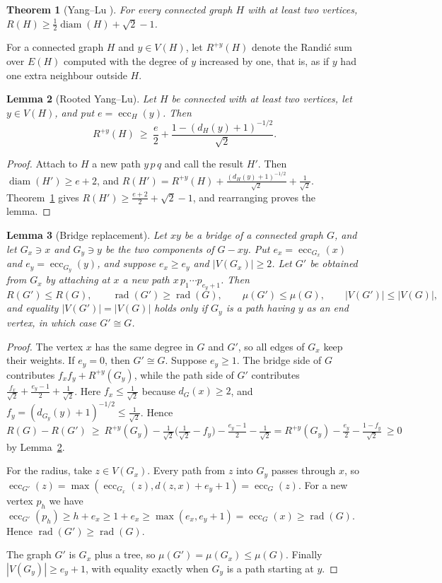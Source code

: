 \documentclass[11pt,a4paper]{article}
\newtheorem{theorem}{Theorem}[section]
\newtheorem{lemma}[theorem]{Lemma}
\theoremstyle{definition}
\newcommand{\rad}{\operatorname{rad}}
\newcommand{\diam}{\operatorname{diam}}
\newcommand{\ecc}{\operatorname{ecc}}
\begin{document}
\begin{theorem}[Yang--Lu \cite{YangLu}]\label{thm:YL}
For every connected graph $H$ with at least two vertices, $R(H)\ge\frac12\diam(H)+\sqrt2-1$.
\end{theorem}

For a connected graph $H$ and $y\in V(H)$, let $R^{+y}(H)$ denote the Randi\'c sum over $E(H)$ computed with the degree of $y$ increased by one, that is, as if $y$ had one extra neighbour outside $H$.

\begin{lemma}[Rooted Yang--Lu]\label{lem:RL}
Let $H$ be connected with at least two vertices, let $y\in V(H)$, and put $e=\ecc_H(y)$. Then
\[
R^{+y}(H)\ \ge\ \frac e2+\frac{1-(d_H(y)+1)^{-1/2}}{\sqrt2}.
\]
\end{lemma}
\begin{proof}
Attach to $H$ a new path $y\,p\,q$ and call the result $H'$. Then $\diam(H')\ge e+2$, and $R(H')=R^{+y}(H)+\frac{(d_H(y)+1)^{-1/2}}{\sqrt2}+\frac1{\sqrt2}$. Theorem~\ref{thm:YL} gives $R(H')\ge\frac{e+2}2+\sqrt2-1$, and rearranging proves the lemma.
\end{proof}

\begin{lemma}[Bridge replacement]\label{lem:BR}
Let $xy$ be a bridge of a connected graph $G$, and let $G_x\ni x$ and $G_y\ni y$ be the two components of $G-xy$. Put $e_x=\ecc_{G_x}(x)$ and $e_y=\ecc_{G_y}(y)$, and suppose $e_x\ge e_y$ and $|V(G_x)|\ge2$. Let $G'$ be obtained from $G_x$ by attaching at $x$ a new path $x\,p_1\cdots p_{e_y+1}$. Then
\[
R(G')\le R(G),\qquad \rad(G')\ge\rad(G),\qquad \mu(G')\le\mu(G),\qquad |V(G')|\le|V(G)|,
\]
and equality $|V(G')|=|V(G)|$ holds only if $G_y$ is a path having $y$ as an end vertex, in which case $G'\cong G$.
\end{lemma}
\begin{proof}
The vertex $x$ has the same degree in $G$ and $G'$, so all edges of $G_x$ keep their weights. If $e_y=0$, then $G'\cong G$. Suppose $e_y\ge1$. The bridge side of $G$ contributes $f_xf_y+R^{+y}(G_y)$, while the path side of $G'$ contributes $\frac{f_x}{\sqrt2}+\frac{e_y-1}2+\frac1{\sqrt2}$. Here $f_x\le\frac1{\sqrt2}$ because $d_G(x)\ge2$, and $f_y=(d_{G_y}(y)+1)^{-1/2}\le\frac1{\sqrt2}$. Hence
\[
R(G)-R(G')\ \ge\ R^{+y}(G_y)-\tfrac1{\sqrt2}\bigl(\tfrac1{\sqrt2}-f_y\bigr)-\tfrac{e_y-1}{2}-\tfrac1{\sqrt2}=R^{+y}(G_y)-\tfrac{e_y}2-\tfrac{1-f_y}{\sqrt2}\ \ge0
\]
by Lemma~\ref{lem:RL}.

For the radius, take $z\in V(G_x)$. Every path from $z$ into $G_y$ passes through $x$, so $\ecc_{G'}(z)=\max(\ecc_{G_x}(z),d(z,x)+e_y+1)=\ecc_G(z)$. For a new vertex $p_h$ we have $\ecc_{G'}(p_h)\ge h+e_x\ge1+e_x\ge\max(e_x,e_y+1)=\ecc_G(x)\ge\rad(G)$. Hence $\rad(G')\ge\rad(G)$.

The graph $G'$ is $G_x$ plus a tree, so $\mu(G')=\mu(G_x)\le\mu(G)$. Finally $|V(G_y)|\ge e_y+1$, with equality exactly when $G_y$ is a path starting at $y$.
\end{proof}
\end{document}
